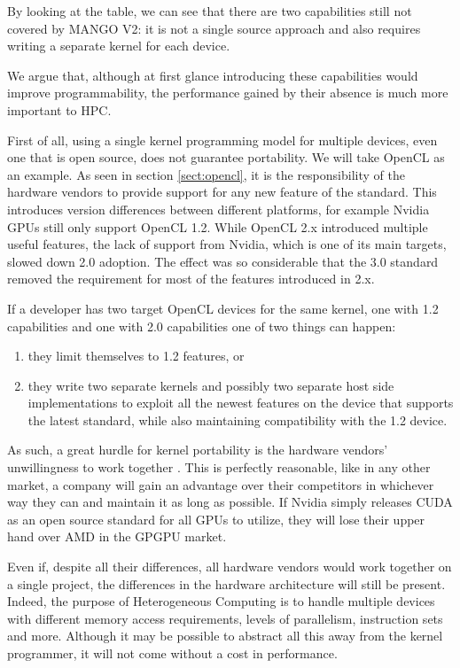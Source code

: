 By looking at the table, we can see that there are two capabilities still not covered by MANGO V2: it is not a single source approach and also requires writing a separate kernel for each device.

We argue that, although at first glance introducing these capabilities would improve programmability, the performance gained by their absence is much more important to HPC.

First of all, using a single kernel programming model for multiple devices, even one that is open source, does not guarantee portability. We will take OpenCL as an example. As seen in section \ref{sect:opencl}, it is the responsibility of the hardware vendors to provide support for any new feature of the standard. This introduces version differences between different platforms, for example Nvidia GPUs still only support OpenCL 1.2. While OpenCL 2.x introduced multiple useful features, the lack of support from Nvidia, which is one of its main targets, slowed down 2.0 adoption. The effect was so considerable that the 3.0 standard removed the requirement for most of the features introduced in 2.x. 

If a developer has two target OpenCL devices for the same kernel, one with 1.2 capabilities and one with 2.0 capabilities one of two things can happen: 
\begin{enumerate}
    \item they limit themselves to 1.2 features, or
    \item they write two separate kernels and possibly two separate host side implementations to exploit all the newest features on the device that supports the latest standard, while also maintaining compatibility with the 1.2 device.
\end{enumerate}
 
As such, a great hurdle for kernel portability is the hardware vendors' unwillingness to work together \cite{but_mummy_cuda}. This is perfectly reasonable, like in any other market, a company will gain an advantage over their competitors in whichever way they can and maintain it as long as possible. If Nvidia simply releases CUDA as an open source standard for all GPUs to utilize, they will lose their upper hand over AMD in the GPGPU market.

Even if, despite all their differences, all hardware vendors would work together on a single project, the differences in the hardware architecture will still be present. Indeed, the purpose of Heterogeneous Computing is to handle multiple devices with different memory access requirements, levels of parallelism, instruction sets and more. Although it may be possible to abstract all this away from the kernel programmer, it will not come without a cost in performance.

